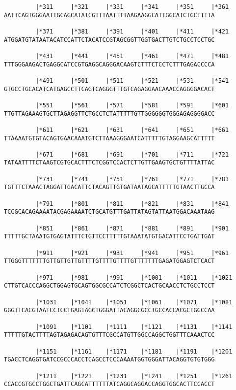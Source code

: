 \documentclass{article}
\begin{document}
\begin{Verbatim}
         |*311     |*321     |*331     |*341     |*351     |*361
AATTCAGTGGGAATTGCAGCATATCGTTTAATTTTAAGAAGGCATTGGCATCTGCTTTTA
  
         |*371     |*381     |*391     |*401     |*411     |*421
ATGGATGTATAATACATCCATTCTACATCCGTAGCGGTTGGTGACTTGTCTGCCTCCTGC
  
         |*431     |*441     |*451     |*461     |*471     |*481
TTTGGGAAGACTGAGGCATCCGTGAGGCAGGGACAAGTCTTTCTCCTCTTTGAGACCCCA
  
         |*491     |*501     |*511     |*521     |*531     |*541
GTGCCTGCACATCATGAGCCTTCAGTCAGGGTTTGTCAGAGGAACAAACCAGGGGACACT
  
         |*551     |*561     |*571     |*581     |*591     |*601
TTGTTAGAAAGTGCTTAGAGGTTCTGCCTCTATTTTTGTTGGGGGGTGGGAGAGGGGACC
  
         |*611     |*621     |*631     |*641     |*651     |*661
TTAAAATGTGTACAGTGAACAAATGTCTTAAAGGGAATCATTTTTGTAGGAAGCATTTTT
  
         |*671     |*681     |*691     |*701     |*711     |*721
TATAATTTTCTAAGTCGTGCACTTTCTCGGTCCACTCTTGTTGAAGTGCTGTTTTATTAC
  
         |*731     |*741     |*751     |*761     |*771     |*781
TGTTTCTAAACTAGGATTGACATTCTACAGTTGTGATAATAGCATTTTTGTAACTTGCCA
  
         |*791     |*801     |*811     |*821     |*831     |*841
TCCGCACAGAAAATACGAGAAAATCTGCATGTTTGATTATAGTATTAATGGACAAATAAG
  
         |*851     |*861     |*871     |*881     |*891     |*901
TTTTTGCTAAATGTGAGTATTTCTGTTCCTTTTTGTAAATATGTGACATTCCTGATTGAT
  
         |*911     |*921     |*931     |*941     |*951     |*961
TTGGGTTTTTTTGTTGTTGTTGTTTTGTTTTGTTTTGTTTTTTTGAGATGGAGTCTCACT
  
         |*971     |*981     |*991     |*1001    |*1011    |*1021
CTTGTCACCCAGGCTGGAGTGCAGTGGCGCCATCTCGGCTCACTGCAACCTCTGCCTCCT
  
         |*1031    |*1041    |*1051    |*1061    |*1071    |*1081
GGGTTCACGTAATCCTCCTGAGTAGCTGGGATTACAGGCGCCTGCCACCACGCTGGCCAA
  
         |*1091    |*1101    |*1111    |*1121    |*1131    |*1141
TTTTTGTACTTTTAGTAGAGACAGTGTTTCGCCATGTTGGCCAGGCTGGTTTCAAACTCC
  
         |*1151    |*1161    |*1171    |*1181    |*1191    |*1201
TGACCTCAGGTGATCCGCCCACCTCAGCCTCCCAAAATGGTGGGATTACAGGTGTGTGGG
  
         |*1211    |*1221    |*1231    |*1241    |*1251    |*1261
CCACCGTGCCTGGCTGATTCAGCATTTTTTATCAGGCAGGACCAGGTGGCACTTCCACCT
  

\end{Verbatim}
\end{document}

